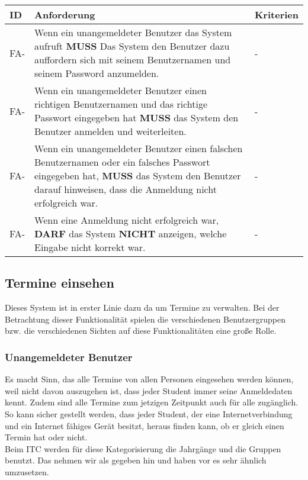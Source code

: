\begin{tabular} {|p{}|p{11cm}|p{}|}
	\hline
	ID & Anforderung & Kriterien \\
	\hline
	FA-
	& Wenn ein unangemeldeter Benutzer das System aufruft \textbf{MUSS} Das System den Benutzer dazu auffordern sich mit seinem Benutzernamen und seinem Password anzumelden.
	& - \\
	\hline
	FA- 
	& Wenn ein unangemeldeter Benutzer einen richtigen Benutzernamen und das richtige Passwort eingegeben hat \textbf{MUSS} das System den Benutzer anmelden und weiterleiten.
	& -  \\
	\hline
	FA- 
	& Wenn ein unangemeldeter Benutzer einen falschen Benutzernamen oder ein falsches Passwort eingegeben hat, \textbf{MUSS} das System den Benutzer darauf hinweisen, dass die Anmeldung nicht erfolgreich war.
	& - \\
	\hline
	FA-
	& Wenn eine Anmeldung nicht erfolgreich war, \textbf{DARF} das System \textbf{NICHT} anzeigen, welche Eingabe nicht korrekt war.
	& - \\
	\hline
\end{tabular}

\newpage

\subsection{Termine einsehen}
Dieses System ist in erster Linie dazu da um Termine zu verwalten. Bei der Betrachtung dieser Funktionalität spielen die verschiedenen Benutzergruppen bzw. die verschiedenen Sichten auf diese Funktionalitäten eine große Rolle. 

\vspace{12pt}

\subsubsection{Unangemeldeter Benutzer}
Es macht Sinn, das alle Termine von allen Personen eingesehen werden können, weil nicht davon auszugehen ist, dass jeder Student immer seine Anmeldedaten kennt. Zudem sind alle Termine zum jetzigen Zeitpunkt auch für alle zugänglich. So kann sicher gestellt werden, dass jeder Student, der eine Internetverbindung und ein Internet fähiges Gerät besitzt, heraus finden kann, ob er gleich einen Termin hat oder nicht. \\
Beim ITC werden für diese Kategorisierung die Jahrgänge und die Gruppen benutzt. Das nehmen wir als gegeben hin und haben vor es sehr ähnlich umzusetzen.

